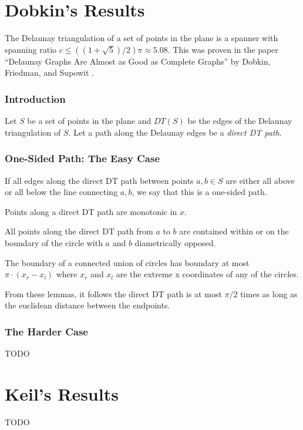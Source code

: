\documentclass{tufte-handout}
\title{\DocTitle}
\author{\DocAuthor}
\begin{document}
\maketitle


\part{Dobkin's Results}

The Delaunay triangulation of a set of points in the plane is a
spanner with spanning ratio $c \le ((1 + \sqrt{5})/2)\pi \approx
5.08$.  This was proven in the paper ``Delaunay Graphs Are Almost as
Good as Complete Graphs'' by Dobkin, Friedman, and Supowit
\cite{Dobkin:1987} \cite{Dobkin:1990}.

\section{Introduction}

Let $S$ be a set of points in the plane and $DT(S)$ be the edges of
the Delaunay triangulation of $S$.  Let a path along the Delaunay
edges be a \emph{direct DT path}.

\section{One-Sided Path: The Easy Case}

If all edges along the direct DT path between points $a,b \in S$ are
either all above or all below the line connecting $a,b$, we say that
this is a one-sided path.

\begin{Lemma}

  Points along a direct DT path are monotonic in $x$.

\end{Lemma}

\begin{Lemma}

  All points along the direct DT path from $a$ to $b$ are contained
  within or on the boundary of the circle with $a$ and $b$
  diametrically opposed.
  
\end{Lemma}

\begin{Lemma}

  The boundary of a connected union of circles has boundary at most
  $\pi \cdot (x_r - x_l)$ where $x_r$ and $x_l$ are the extreme x
  coordinates of any of the circles.
  
\end{Lemma}

From these lemmas, it follows the direct DT path is at most $\pi/2$
times as long as the euclidean distance between the endpoints.

\section{The Harder Case}

TODO

\part{Keil's Results}

TODO


\newpage

\end{document}
